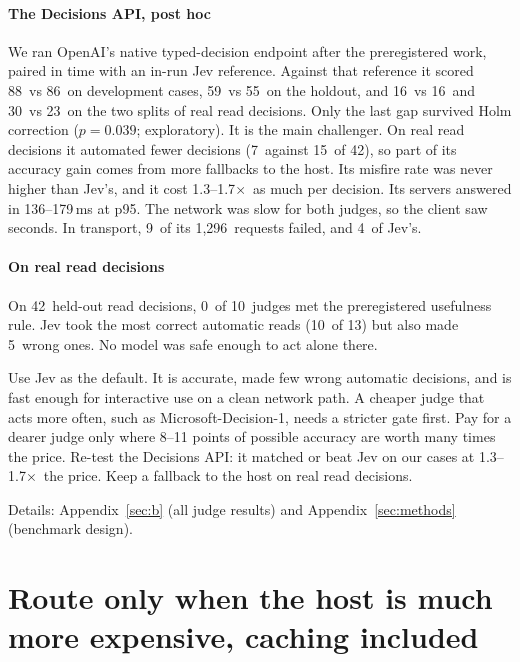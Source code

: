 \documentclass[11pt,letterpaper]{article}
\newcommand{\X}{\ensuremath{\times}}
\newcommand{\OaDevJevK}{86}
\newcommand{\OaDevLunaK}{88}
\newcommand{\OaHoldoutJevK}{55}
\newcommand{\OaHoldoutLunaK}{59}
\newcommand{\OaInvalid}{9}
\newcommand{\OaInvalidJev}{4}
\newcommand{\OaPriceXHi}{1.7}
\newcommand{\OaPriceXLo}{1.3}
\newcommand{\OaRequests}{1{,}296}
\newcommand{\OaServerPninetyfiveHi}{179}
\newcommand{\OaServerPninetyfiveLo}{136}
\newcommand{\OaTrHoldHolm}{0.039}
\newcommand{\OaTrHoldJevCovK}{15}
\newcommand{\OaTrHoldLunaCovK}{7}
\newcommand{\OaTrHoldN}{42}
\newcommand{\OaTraceDevJevK}{16}
\newcommand{\OaTraceDevLunaK}{16}
\newcommand{\OaTraceHoldoutJevK}{23}
\newcommand{\OaTraceHoldoutLunaK}{30}
\newcommand{\NumBase}{10}
\newcommand{\TrJevReads}{10}
\newcommand{\TrJevWaK}{5}
\newcommand{\TrN}{42}
\newcommand{\TrNUseful}{0}
\newcommand{\TrReadCases}{13}
\newcommand{\StSec}[1]{Appendix~\ref{#1}}
\begin{document}
\paragraph{The Decisions API, post hoc} We ran OpenAI's native typed-decision endpoint after the preregistered work,
paired in time with an in-run Jev reference. Against that reference it scored \OaDevLunaK\ vs \OaDevJevK\ on
development cases, \OaHoldoutLunaK\ vs \OaHoldoutJevK\ on the holdout, and \OaTraceDevLunaK\ vs \OaTraceDevJevK\ and
\OaTraceHoldoutLunaK\ vs \OaTraceHoldoutJevK\ on the two splits of real read decisions. Only the last gap survived Holm
correction ($p = \OaTrHoldHolm$; exploratory). It is the main challenger. On real read decisions it automated fewer decisions (\OaTrHoldLunaCovK\ against
\OaTrHoldJevCovK\ of \OaTrHoldN), so part of its accuracy gain comes from more fallbacks to the host. Its misfire rate was never
higher than Jev's, and it cost \OaPriceXLo--\OaPriceXHi\X\ as much per decision. Its servers answered in
\OaServerPninetyfiveLo--\OaServerPninetyfiveHi\,ms at p95. The network was slow for both judges, so the client saw
seconds. In transport, \OaInvalid\ of its \OaRequests\ requests failed, and \OaInvalidJev\ of Jev's.

\paragraph{On real read decisions} On \TrN\ held-out read decisions, \TrNUseful\ of \NumBase\ judges met the
preregistered usefulness rule. Jev took the most correct automatic reads (\TrJevReads\ of \TrReadCases) but also made
\TrJevWaK\ wrong ones. No model was safe enough to act alone there.

\begin{keyidea}[title={For practitioners}]
Use Jev as the default. It is accurate, made few wrong automatic decisions, and is fast enough for interactive use on a
clean network path. A cheaper judge that acts more often, such as Microsoft-Decision-1, needs a stricter gate first. Pay for a dearer judge only where 8--11 points of possible accuracy are worth many times the price. Re-test the
Decisions API: it matched or beat Jev on our cases at \OaPriceXLo--\OaPriceXHi\X\ the price. Keep a fallback to the
host on real read decisions.
\end{keyidea}

Details: \StSec{sec:b} (all judge results) and \StSec{sec:methods} (benchmark design).
\section{Route only when the host is much more expensive, caching included}\label{sec:routing}
\end{document}
